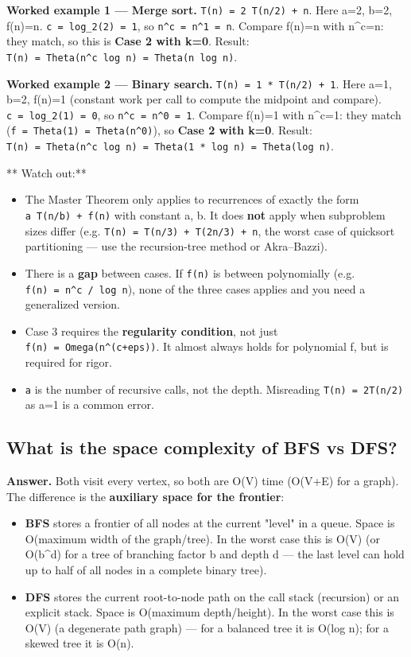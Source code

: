 \documentclass[11pt]{article}
\providecommand{\tightlist}{\setlength{\itemsep}{1pt}\setlength{\parskip}{0pt}}
\begin{document}
\textbf{Worked example 1 --- Merge sort.} \texttt{T(n)\ =\ 2\ T(n/2)\ +\ n}. Here a=2, b=2, f(n)=n.
\texttt{c\ =\ log\_2(2)\ =\ 1}, so \texttt{n\^{}c\ =\ n\^{}1\ =\ n}. Compare f(n)=n with n\^{}c=n: they match, so this is \textbf{Case 2 with k=0}.
Result: \texttt{T(n)\ =\ Theta(n\^{}c\ log\ n)\ =\ Theta(n\ log\ n)}.

\textbf{Worked example 2 --- Binary search.} \texttt{T(n)\ =\ 1\ *\ T(n/2)\ +\ 1}. Here a=1, b=2, f(n)=1 (constant work per call to compute the midpoint and compare).
\texttt{c\ =\ log\_2(1)\ =\ 0}, so \texttt{n\^{}c\ =\ n\^{}0\ =\ 1}. Compare f(n)=1 with n\^{}c=1: they match (\texttt{f\ =\ Theta(1)\ =\ Theta(n\^{}0)}), so \textbf{Case 2 with k=0}.
Result: \texttt{T(n)\ =\ Theta(n\^{}c\ log\ n)\ =\ Theta(1\ *\ log\ n)\ =\ Theta(log\ n)}.

** Watch out:**

\begin{itemize}
\tightlist
\item
  The Master Theorem only applies to recurrences of exactly the form \texttt{a\ T(n/b)\ +\ f(n)} with constant a, b. It does \textbf{not} apply when subproblem sizes differ (e.g. \texttt{T(n)\ =\ T(n/3)\ +\ T(2n/3)\ +\ n}, the worst case of quicksort partitioning --- use the recursion-tree method or Akra--Bazzi).
\item
  There is a \textbf{gap} between cases. If \texttt{f(n)} is between polynomially (e.g. \texttt{f(n)\ =\ n\^{}c\ /\ log\ n}), none of the three cases applies and you need a generalized version.
\item
  Case 3 requires the \textbf{regularity condition}, not just \texttt{f(n)\ =\ Omega(n\^{}(c+eps))}. It almost always holds for polynomial f, but is required for rigor.
\item
  \texttt{a} is the number of recursive calls, not the depth. Misreading \texttt{T(n)\ =\ 2T(n/2)} as a=1 is a common error.
\end{itemize}

\subsection{What is the space complexity of BFS vs DFS?}\label{what-is-the-space-complexity-of-bfs-vs-dfs}

\textbf{Answer.} Both visit every vertex, so both are O(V) time (O(V+E) for a graph). The difference is the \textbf{auxiliary space for the frontier}:

\begin{itemize}
\tightlist
\item
  \textbf{BFS} stores a frontier of all nodes at the current "level" in a queue. Space is O(maximum width of the graph/tree). In the worst case this is O(V) (or O(b\^{}d) for a tree of branching factor b and depth d --- the last level can hold up to half of all nodes in a complete binary tree).
\item
  \textbf{DFS} stores the current root-to-node path on the call stack (recursion) or an explicit stack. Space is O(maximum depth/height). In the worst case this is O(V) (a degenerate path graph) --- for a balanced tree it is O(log n); for a skewed tree it is O(n).
\end{itemize}
\end{document}
